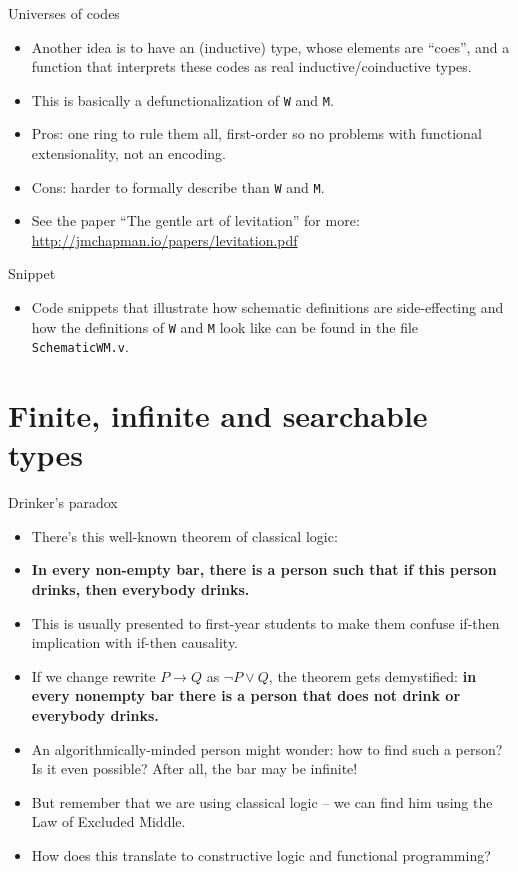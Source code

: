 \documentclass{beamer}
\begin{document}
\begin{frame}{Universes of codes}
\begin{itemize}
	\item Another idea is to have an (inductive) type, whose elements are ``coes'', and a function that interprets these codes as real inductive/coinductive types.
	\item This is basically a defunctionalization of \texttt{W} and \texttt{M}.
	\item Pros: one ring to rule them all, first-order so no problems with functional extensionality, not an encoding.
	\item Cons: harder to formally describe than \texttt{W} and \texttt{M}.
	\item See the paper ``The gentle art of levitation'' for more: \url{http://jmchapman.io/papers/levitation.pdf}
\end{itemize}
\end{frame}

\begin{frame}{Snippet}
\begin{itemize}
	\item Code snippets that illustrate how schematic definitions are side-effecting and how the definitions of \texttt{W} and \texttt{M} look like can be found in the file \texttt{SchematicWM.v}.
\end{itemize}
\end{frame}

\section{Finite, infinite and searchable types}

\begin{frame}{Drinker's paradox}
\begin{itemize}
	\item There's this well-known theorem of classical logic:
	\item \textbf{In every non-empty bar, there is a person such that if this person drinks, then everybody drinks.}
	\item This is usually presented to first-year students to make them confuse if-then implication with if-then causality.
	\item If we change rewrite $P \to Q$ as $\neg P \lor Q$, the theorem gets demystified: \textbf{in every nonempty bar there is a person that does not drink or everybody drinks.}
	\item An algorithmically-minded person might wonder: how to find such a person? Is it even possible? After all, the bar may be infinite!
	\item But remember that we are using classical logic -- we can find him using the Law of Excluded Middle.
	\item How does this translate to constructive logic and functional programming?
\end{itemize}
\end{frame}
\end{document}
